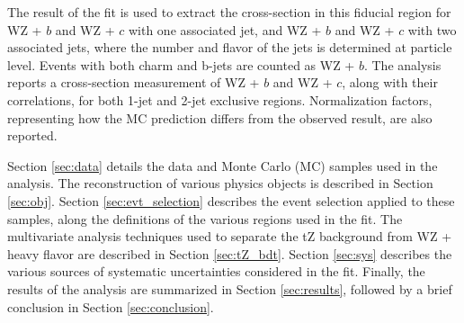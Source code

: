 The result of the fit is used to extract the cross-section in this fiducial region for WZ + $b$ and WZ + $c$ with one associated jet, and WZ + $b$ and WZ + $c$ with two associated jets, where the number and flavor of the jets is determined at particle level. Events with both charm and b-jets are counted as WZ + $b$. The analysis reports a cross-section measurement of WZ + $b$ and WZ + $c$, along with their correlations, for both 1-jet and 2-jet exclusive regions. Normalization factors, representing how the MC prediction differs from the observed result, are also reported.

Section \ref{sec:data} details the data and Monte Carlo (MC) samples used in the analysis. The reconstruction of various physics objects is described in Section \ref{sec:obj}. Section \ref{sec:evt_selection} describes the event selection applied to these samples, along the definitions of the various regions used in the fit. The multivariate analysis techniques used to separate the tZ background from WZ + heavy flavor are described in Section \ref{sec:tZ_bdt}. Section \ref{sec:sys} describes the various sources of systematic uncertainties considered in the fit. Finally, the results of the analysis are summarized in Section \ref{sec:results}, followed by a brief conclusion in Section \ref{sec:conclusion}.


